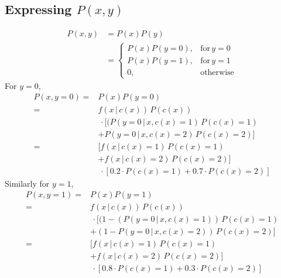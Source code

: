 \documentclass[9pt,twocolumn]{article}
\begin{document}
\subsection*{Expressing $P(x,y)$}
\begin{equation*}
\begin{split}
	P(x,y) & = P(x)P(y) \\
	& =
\begin{cases}
	P(x)P(y=0),& \text{for} \,y=0\\
	P(x)P(y=1),& \text{for} \,y=1\\
	0         ,& \text{otherwise}
\end{cases}
\end{split}
\end{equation*}
For $y=0$,
\begin{equation*}
\begin{split}
	P(x,y=0) = & P(x)P(y=0) \\
	= & f(x\,|\,c(x))\,P(c(x))\\
	& \,\cdot [(P(y=0\,|\,x,c(x)=1)\,P(c(x)=1)\\
	& + P(y=0\,|\,x,c(x)=2)\,P(c(x)=2)]\\
	= & [f(x\,|\,c(x)=1)\,P(c(x)=1)\\
	& + f(x\,|\,c(x)=2)\,P(c(x)=2)]\\
	& \,\cdot [0.2 \cdot P(c(x)=1) + 0.7 \cdot P(c(x)=2)]
\end{split}
\end{equation*}
Similarly for $y=1$,
\begin{equation*}
\begin{split}
	P(x,y=1) = & P(x)P(y=1) \\
	= & f(x\,|\,c(x))\,P(c(x))\\
	& \,\cdot [(1-(P(y=0\,|\,x,c(x)=1))\,P(c(x)=1)\\
	& + (1-P(y=0\,|\,x,c(x)=2))\,P(c(x)=2)]\\
	= & [f(x\,|\,c(x)=1)\,P(c(x)=1)\\
	& + f(x\,|\,c(x)=2)\,P(c(x)=2)]\\
	& \,\cdot [0.8 \cdot P(c(x)=1) + 0.3 \cdot P(c(x)=2)]
\end{split}
\end{equation*}
\end{document}
